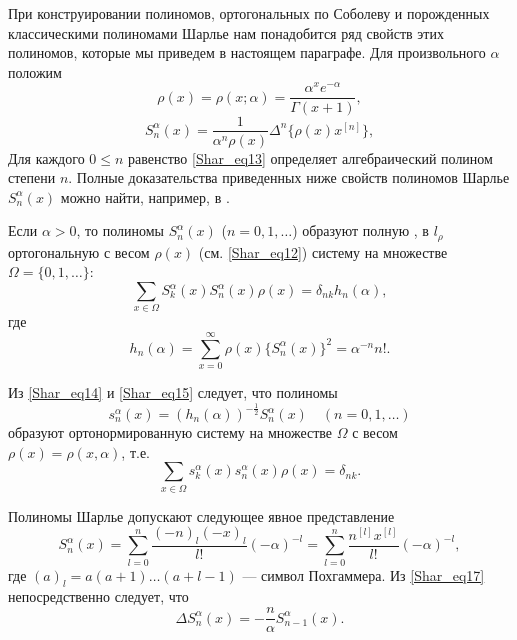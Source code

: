 При конструировании полиномов, ортогональных по Соболеву и порожденных классическими полиномами Шарлье нам понадобится ряд свойств этих полиномов, которые мы приведем в настоящем параграфе.
Для произвольного $\alpha$ положим
\begin{equation}\label{Shar_eq12}
\rho(x)=\rho(x;\alpha)=\frac{\alpha^x e^{-\alpha}}{\Gamma(x+1)},
\end{equation}
\begin{equation}\label{Shar_eq13}
S_n^{\alpha}(x)=\frac{1}{\alpha^n \rho(x)} \Delta^n \{\rho(x)x^{[n]}\},
\end{equation}
Для каждого $0\le n$ равенство \eqref{Shar_eq13} определяет \cite{Shar9, Shar10} алгебраический полином степени $n$.
Полные доказательства приведенных ниже свойств полиномов Шарлье $S_n^{\alpha}(x)$
можно найти, например, в \cite{Shar9}.

Если $\alpha>0$, то полиномы $S_n^{\alpha}(x)$ ($n=0,1,\ldots$) образуют полную \cite[стр. 243]{Shar9}, \cite[стр. 375]{Shar11} в $l_\rho$ ортогональную с весом $\rho(x)$ (см. \eqref{Shar_eq12}) систему на множестве $\Omega=\{0,1,\ldots\}$:
\begin{equation}\label{Shar_eq14}
\sum_{x\in\Omega}S_k^\alpha(x)S_n^\alpha(x)\rho(x)=\delta_{nk} h_n(\alpha),
\end{equation}
где
\begin{equation}\label{Shar_eq15}
h_n(\alpha) = \sum_{x=0}^{\infty} \rho(x) \{S_n^\alpha(x)\}^2 = \alpha^{-n} n! .
\end{equation}

Из \eqref{Shar_eq14} и \eqref{Shar_eq15} следует, что полиномы
\begin{equation}\label{Shar_eq16}
s_n^\alpha(x)=(h_n(\alpha))^{-\frac12} S_n^\alpha(x) \quad (n=0,1,\ldots)
\end{equation}
образуют ортонормированную систему на множестве $\Omega$ с весом $\rho(x)=\rho(x,\alpha)$, т.е.
\begin{equation*}
\sum_{x\in\Omega} s_k^\alpha(x) s_n^\alpha(x)\rho(x)=\delta_{nk}.
\end{equation*}

Полиномы Шарлье допускают следующее явное представление
\begin{equation} \label{Shar_eq17}
S_n^\alpha(x) = \sum_{l=0}^n \frac{(-n)_l(-x)_l}{l!} (-\alpha)^{-l} = \sum_{l=0}^n \frac{n^{[l]}x^{[l]}}{l!} (-\alpha)^{-l},
\end{equation}
где $(a)_l=a(a+1)\ldots(a+l-1)$ --- символ Похгаммера. Из \eqref{Shar_eq17} непосредственно следует, что
\begin{equation}\label{Shar_eq18}
\Delta S_n^{\alpha}(x) = -\frac{n}{\alpha} S_{n-1}^{\alpha}(x).
\end{equation}

